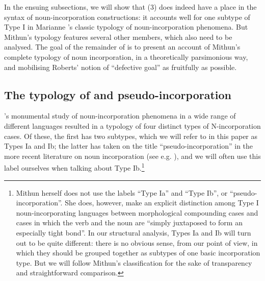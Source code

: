 \documentclass[output=paper]{langsci/langscibook}
\newcommand{\posscite}[1]{\citeauthor{#1}'s \citeyearpar{#1}}
\begin{document}
\begin{refcontext}
In the ensuing subsections, we will show that (3) does indeed have a place in
the syntax of noun-incorporation constructions: it accounts well for one
subtype of Type I in Marianne \posscite{mithun84} classic typology of
noun-incorporation phenomena. But Mithun’s typology features several other
members, which also need to be analysed. The goal of the remainder of
 is to present an account of Mithun’s complete typology of noun
incorporation, in a theoretically parsimonious way, and mobilising Roberts’
notion of \enquote{defective goal} as fruitfully as possible.

\subsection{The typology of  and pseudo-incorporation}\largerpage
\posscite{mithun84} monumental study of noun-incorporation phenomena in a wide range of different
languages resulted in a typology of four distinct types of N-incorporation cases. Of these, the first
has two subtypes, which we will refer to in this paper as Types Ia and Ib; the latter has taken on the
title \enquote{pseudo-incorporation} in the more recent literature on noun
incorporation (see e.g. \citealt{massam01}), and we will often use this label
ourselves when talking about Type Ib.\footnote{Mithun herself does not
    use the labels \enquote{Type Ia} and \enquote{Type Ib}, or
    \enquote{pseudo-incorporation}. She does, however, make an explicit
    distinction among Type I noun-incorporating languages between morphological
    compounding cases and cases in which the verb and the noun are
    \enquote{simply juxtaposed to form an especially tight bond}. In our
    structural analysis, Types Ia and Ib will turn out to be
    quite different: there is no obvious sense, from our point of view, in
    which they should be grouped together as subtypes of one basic
incorporation type. But we will follow Mithun’s classification for the sake of
transparency and straightforward comparison.}\largerpage[-2]


\end{refcontext}
\end{document}
